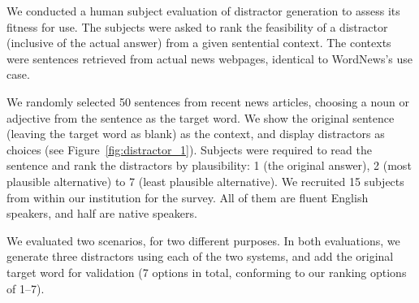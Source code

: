 



We conducted a human subject evaluation of distractor generation to
assess its fitness for use.  The subjects were asked to rank the
feasibility of a distractor (inclusive of the actual answer) from a
given sentential context.  The contexts were sentences retrieved from
actual news webpages, identical to WordNews's use case.

We randomly selected 50 sentences from recent news articles, choosing
a noun or adjective from the sentence as the target word. We show the
original sentence (leaving the target word as blank) as the context,
and display distractors as choices (see
Figure~\ref{fig:distractor_1}). Subjects were required to read the
sentence and rank the distractors by plausibility: 1 (the original
answer), 2 (most plausible alternative) to 7 (least plausible
alternative).  We recruited 15 subjects from within our institution
for the survey.  All of them are fluent English speakers, and half are
native speakers.
 
We evaluated two scenarios, for two different purposes. In both
evaluations, we generate three distractors using each of the two systems,
and add the original target word for validation (7 options in total,
conforming to our ranking options of 1--7).

